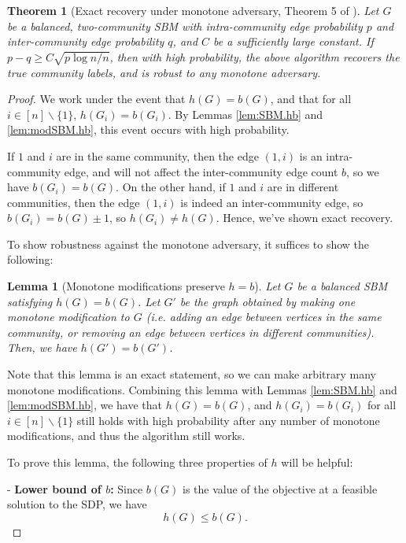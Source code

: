 \documentclass[11pt, titlepage]{article} %
\numberwithin{equation}{section}
\newtheorem{theorem}{Theorem}
\newtheorem{lemma}{Lemma}
\theoremstyle{definition}
\numberwithin{theorem}{section}
\numberwithin{lemma}{section}
\numberwithin{corollary}{section}
\numberwithin{proposition}{section}
\numberwithin{definition}{section}
\numberwithin{remark}{section}
\begin{document}
\begin{theorem}[Exact recovery under monotone adversary, Theorem 5 of \cite{FK01}] 
\label{thm:monotone}
Let $G$ be a balanced, two-community SBM with intra-community edge probability $p$ and 
inter-community edge probability $q$, and $C$ be a sufficiently large constant. 
If $p - q \geq C \sqrt{p \log n / n}$, then with high probability, the above algorithm
recovers the true community labels, and is robust to any monotone adversary.
\end{theorem}
\begin{proof}
We work under the event that $h(G) = b(G)$, and that for all $i \in [n]\backslash \{1\}$, 
$h(G_i) = b(G_i)$. By Lemmas \ref{lem:SBM.hb} and \ref{lem:modSBM.hb}, this event occurs with high 
probability.

If $1$ and $i$ are in the same community, then the edge $(1,i)$ is an intra-community edge, and
will not affect the inter-community edge count $b$, so we have $b(G_i) = b(G)$. On the other hand, 
if $1$ and $i$ are in different communities, then the edge $(1,i)$ is indeed an inter-community edge,
so $b(G_i) = b(G) \pm 1$, so $h(G_i) \neq h(G)$. Hence, we've shown exact recovery.

To show robustness against the monotone adversary, it suffices to show the following:
\begin{lemma}[Monotone modifications preserve $h = b$]
\label{lem:monotone.robust}
Let $G$ be a balanced SBM satisfying $h(G) = b(G)$. Let $G'$ be the graph obtained by making one 
monotone modification to $G$ (i.e. adding an edge between vertices in the same community, or removing
an edge between vertices in different communities). Then, we have $h(G') = b(G')$.
\end{lemma}
Note that this lemma is an exact statement, so we can make arbitrary many monotone modifications.
Combining this lemma with Lemmas \ref{lem:SBM.hb} and \ref{lem:modSBM.hb}, we have that $h(G) = b(G)$,
and $h(G_i) = b(G_i)$ for all $i \in [n]\backslash \{1\}$ still holds with high probability after
any number of monotone modifications, and thus the algorithm still works.

To prove this lemma, the following three properties of $h$ will be helpful:

- \textbf{Lower bound of $b$:} Since $b(G)$ is the value of the objective at a feasible solution to 
the SDP, we have
\[h(G) \leq b(G).\]


\end{proof}
\end{document}
